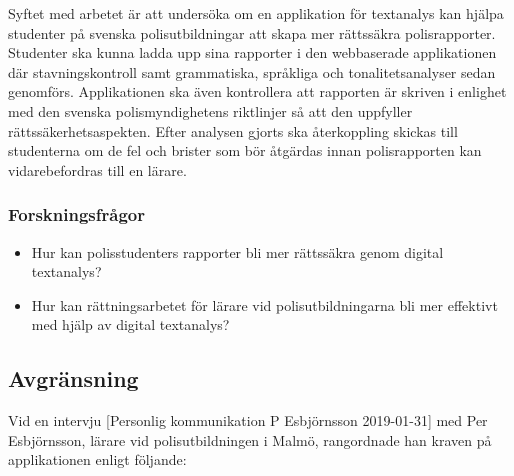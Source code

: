\documentclass[swedish]{maucsthesis}
\begin{document}
Syftet med arbetet är att undersöka om en applikation för textanalys kan
hjälpa studenter på svenska polisutbildningar att skapa mer rättssäkra
polisrapporter. Studenter ska kunna ladda upp sina rapporter i den webbaserade
applikationen där stavningskontroll samt grammatiska, språkliga och
tonalitetsanalyser sedan genomförs. Applikationen ska även kontrollera att rapporten
är skriven i enlighet med den svenska polismyndighetens riktlinjer så att den
uppfyller rättssäkerhetsaspekten. Efter analysen gjorts ska
återkoppling skickas till studenterna om de fel och brister som bör åtgärdas innan
polisrapporten kan vidarebefordras till en lärare.

\subsubsection{Forskningsfrågor}

\begin{itemize}
\item Hur kan polisstudenters rapporter bli mer rättssäkra genom digital
  textanalys?
\item Hur kan rättningsarbetet för lärare vid polisutbildningarna bli mer
  effektivt med hjälp av digital textanalys?
\end{itemize}

\subsection{Avgränsning}\label{avgränsning}

Vid en intervju [Personlig kommunikation P Esbjörnsson 2019-01-31] med Per Esbjörnsson, lärare vid polisutbildningen i Malmö, rangordnade han kraven på applikationen enligt följande:
\end{document}
